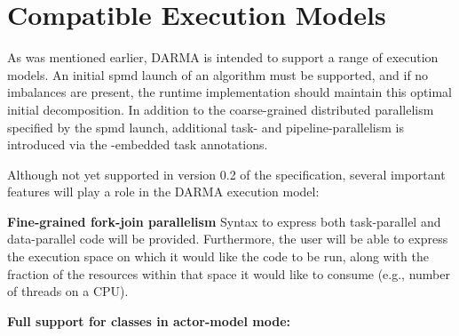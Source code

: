 \section{Compatible Execution Models}
\label{sec:exec_model}

As was mentioned earlier, DARMA is intended to support a range of execution
models.  An initial \gls{spmd} launch of an algorithm must be supported, and if
no imbalances are present, the runtime implementation should maintain this
optimal initial decomposition. In addition to the coarse-grained distributed
parallelism specified by the \gls{spmd} launch, additional task- and
pipeline-parallelism is introduced via the \CC-embedded task annotations.

Although not yet supported in version 0.2 of the specification, several
important features will play a role in the DARMA execution model:
\begin{compactdesc}
\item{\bf Fine-grained \gls{fork-join} parallelism}
Syntax to express both task-parallel and data-parallel code will be provided.
Furthermore, the user will be able to express the \gls{execution space} on
which it would like the code to be run, along with the fraction of the resources within
that space it would like to consume (e.g., number of threads on a CPU).
\item{\bf Full support for classes in actor-model mode:}
\end{compactdesc}

